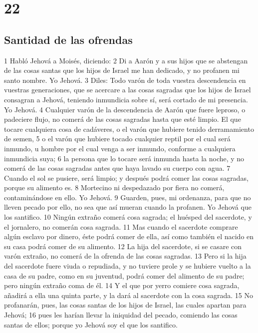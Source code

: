 \chapter{22}

\section{Santidad de las ofrendas}

1 Habló Jehová a Moisés, diciendo:
2 Di a Aarón y a sus hijos que se abstengan de las cosas santas que los hijos de Israel me han dedicado, y no profanen mi santo nombre. Yo Jehová.
3 Diles: Todo varón de toda vuestra descendencia en vuestras generaciones, que se acercare a las cosas sagradas que los hijos de Israel consagran a Jehová, teniendo inmundicia sobre sí, será cortado de mi presencia. Yo Jehová.
4 Cualquier varón de la descendencia de Aarón que fuere leproso, o padeciere flujo, no comerá de las cosas sagradas hasta que esté limpio. El que tocare cualquiera cosa de cadáveres, o el varón que hubiere tenido derramamiento de semen,
5 o el varón que hubiere tocado cualquier reptil por el cual será inmundo, u hombre por el cual venga a ser inmundo, conforme a cualquiera inmundicia suya;
6 la persona que lo tocare será inmunda hasta la noche, y no comerá de las cosas sagradas antes que haya lavado su cuerpo con agua.
7 Cuando el sol se pusiere, será limpio; y después podrá comer las cosas sagradas, porque su alimento es.
8 Mortecino ni despedazado por fiera no comerá, contaminándose en ello. Yo Jehová.
9 Guarden, pues, mi ordenanza, para que no lleven pecado por ello, no sea que así mueran cuando la profanen. Yo Jehová que los santifico.
10 Ningún extraño comerá cosa sagrada; el huésped del sacerdote, y el jornalero, no comerán cosa sagrada.
11 Mas cuando el sacerdote comprare algún esclavo por dinero, éste podrá comer de ella, así como también el nacido en su casa podrá comer de su alimento.
12 La hija del sacerdote, si se casare con varón extraño, no comerá de la ofrenda de las cosas sagradas.
13 Pero si la hija del sacerdote fuere viuda o repudiada, y no tuviere prole y se hubiere vuelto a la casa de su padre, como en su juventud, podrá comer del alimento de su padre; pero ningún extraño coma de él.
14 Y el que por yerro comiere cosa sagrada, añadirá a ella una quinta parte, y la dará al sacerdote con la cosa sagrada.
15 No profanarán, pues, las cosas santas de los hijos de Israel, las cuales apartan para Jehová;
16 pues les harían llevar la iniquidad del pecado, comiendo las cosas santas de ellos; porque yo Jehová soy el que los santifico.
